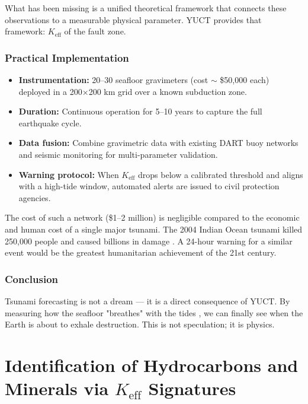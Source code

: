 \documentclass[12pt,a4paper]{article}
\theoremstyle{remark}
\newcommand{\Keff}{K_{\mathrm{eff}}}
\begin{document}
	What has been missing is a unified theoretical framework that connects these observations to a measurable physical parameter. YUCT provides that framework: \(K_{\mathrm{eff}}\) of the fault zone.
	
	\subsubsection{Practical Implementation}
	
	\begin{itemize}
		\item \textbf{Instrumentation:} 20–30 seafloor gravimeters (cost \(\sim\) \$50,000 each) deployed in a 200×200 km grid over a known subduction zone.
		\item \textbf{Duration:} Continuous operation for 5–10 years to capture the full earthquake cycle.
		\item \textbf{Data fusion:} Combine gravimetric data with existing DART buoy networks \cite{NOAA2024} and seismic monitoring \cite{USGS2024} for multi-parameter validation.
		\item \textbf{Warning protocol:} When \(K_{\mathrm{eff}}\) drops below a calibrated threshold and aligns with a high-tide window, automated alerts are issued to civil protection agencies.
	\end{itemize}
	
	The cost of such a network (\$1–2 million) is negligible compared to the economic and human cost of a single major tsunami. The 2004 Indian Ocean tsunami killed 250,000 people and caused billions in damage \cite{NOAA2024, USGS2024}. A 24-hour warning for a similar event would be the greatest humanitarian achievement of the 21st century.
	
	\subsubsection{Conclusion}
	
	Tsunami forecasting is not a dream — it is a direct consequence of YUCT. By measuring how the seafloor "breathes" with the tides \cite{Tolstoy2013}, we can finally see when the Earth is about to exhale destruction. This is not speculation; it is physics.
	
	\section{Identification of Hydrocarbons and Minerals via $\Keff$ Signatures}
	\label{sec:identification}
	
\end{document}
